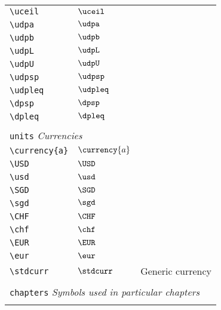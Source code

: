 \begin{longtable}{lll}
 {\color[rgb]{0.5,0.5,0.5}\texttt{\textbackslash uceil}} & $\uceil$ & \\ 
 {\color[rgb]{0.5,0.5,0.5}\texttt{\textbackslash udpa}} & $\udpa$ & \\ 
 {\color[rgb]{0.5,0.5,0.5}\texttt{\textbackslash udpb}} & $\udpb$ & \\ 
 {\color[rgb]{0.5,0.5,0.5}\texttt{\textbackslash udpL}} & $\udpL$ & \\ 
 {\color[rgb]{0.5,0.5,0.5}\texttt{\textbackslash udpU}} & $\udpU$ & \\ 
 {\color[rgb]{0.5,0.5,0.5}\texttt{\textbackslash udpsp}} & $\udpsp$ & \\ 
 {\color[rgb]{0.5,0.5,0.5}\texttt{\textbackslash udpleq}} & $\udpleq$ & \\ 
 {\color[rgb]{0.5,0.5,0.5}\texttt{\textbackslash dpsp}} & $\dpsp$ & \\ 
 {\color[rgb]{0.5,0.5,0.5}\texttt{\textbackslash dpleq}} & $\dpleq$ & \\ 
  &  & \\ 
 \multicolumn{3}{l}{{\color[rgb]{0.5,0.5,0.5}\texttt{units}} \emph{Currencies}}\\ 
 \hline
\hline
{\color[rgb]{0.5,0.5,0.5}\texttt{\textbackslash currency\{a\}}} & $\currency{a}$ & \\ 
 {\color[rgb]{0.5,0.5,0.5}\texttt{\textbackslash USD}} & $\USD$ & \\ 
 {\color[rgb]{0.5,0.5,0.5}\texttt{\textbackslash usd}} & $\usd$ & \\ 
 {\color[rgb]{0.5,0.5,0.5}\texttt{\textbackslash SGD}} & $\SGD$ & \\ 
 {\color[rgb]{0.5,0.5,0.5}\texttt{\textbackslash sgd}} & $\sgd$ & \\ 
 {\color[rgb]{0.5,0.5,0.5}\texttt{\textbackslash CHF}} & $\CHF$ & \\ 
 {\color[rgb]{0.5,0.5,0.5}\texttt{\textbackslash chf}} & $\chf$ & \\ 
 {\color[rgb]{0.5,0.5,0.5}\texttt{\textbackslash EUR}} & $\EUR$ & \\ 
 {\color[rgb]{0.5,0.5,0.5}\texttt{\textbackslash eur}} & $\eur$ & \\ 
 {\color[rgb]{0.5,0.5,0.5}\texttt{\textbackslash stdcurr}} & $\stdcurr$ &  Generic currency\\ 
  &  & \\ 
 \multicolumn{3}{l}{{\color[rgb]{0.5,0.5,0.5}\texttt{chapters}} \emph{Symbols used in particular chapters}}\\ 
 \hline
\hline
 &  & \\ 

\end{longtable}
